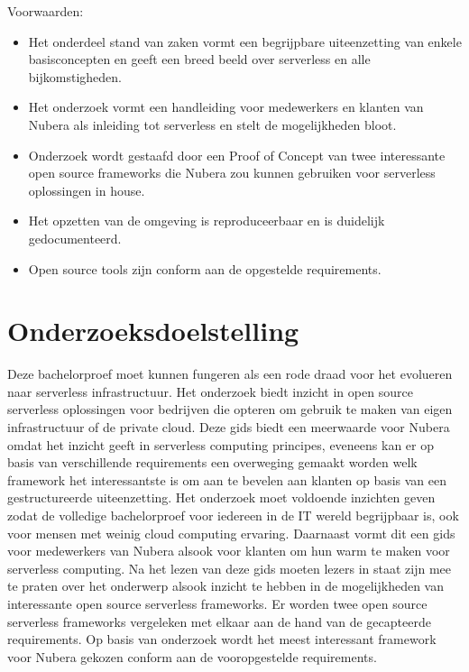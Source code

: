 Voorwaarden: 
\begin{itemize}
    \item Het onderdeel stand van zaken vormt een begrijpbare uiteenzetting van enkele basisconcepten en geeft een breed beeld over serverless en alle bijkomstigheden.
    \item Het onderzoek vormt een handleiding voor medewerkers en klanten van Nubera als inleiding tot serverless en stelt de mogelijkheden bloot.
    \item Onderzoek wordt gestaafd door een Proof of Concept van twee interessante open source frameworks die Nubera zou kunnen gebruiken voor serverless oplossingen in house.
    \item Het opzetten van de omgeving is reproduceerbaar en is duidelijk gedocumenteerd.
    \item Open source tools zijn conform aan de opgestelde requirements.
\end{itemize}



\section{Onderzoeksdoelstelling}
\label{sec:onderzoeksdoelstelling}

Deze bachelorproef moet kunnen fungeren als een rode draad voor het evolueren naar serverless infrastructuur. Het onderzoek biedt inzicht in open source serverless oplossingen voor bedrijven die opteren om gebruik te maken van eigen infrastructuur of de private cloud. Deze gids biedt een meerwaarde voor Nubera omdat het inzicht geeft in serverless computing principes, eveneens kan er op basis van verschillende requirements een overweging gemaakt worden welk framework het interessantste is om aan te bevelen aan klanten op basis van een gestructureerde uiteenzetting. Het onderzoek moet voldoende inzichten geven zodat de volledige bachelorproef voor iedereen in de IT wereld begrijpbaar is, ook voor mensen met weinig cloud computing ervaring. Daarnaast vormt dit een gids voor medewerkers van Nubera alsook voor klanten om hun warm te maken voor serverless computing. Na het lezen van deze gids moeten lezers in staat zijn mee te praten over het onderwerp alsook inzicht te hebben in de mogelijkheden van interessante open source serverless frameworks. Er worden twee open source serverless frameworks vergeleken met elkaar aan de hand van de gecapteerde requirements. Op basis van onderzoek wordt het meest interessant framework voor Nubera gekozen conform aan de vooropgestelde requirements.


